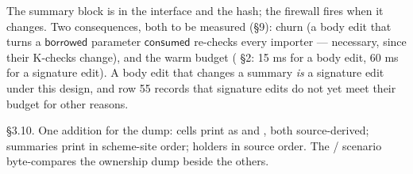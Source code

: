 
The summary block is in the interface and the hash; the firewall fires when it changes. Two consequences, both to be measured (§9): churn (a body edit that turns a $\mathsf{borrowed}$ parameter $\mathsf{consumed}$ re-checks every importer — necessary, since their K-checks change), and the warm budget ( §2: 15 ms for a body edit, 60 ms for a signature edit). A body edit that changes a summary \emph{is} a signature edit under this design, and  row 55 records that signature edits do not yet meet their budget for other reasons.


§3.10. One addition for the dump: cells print as  and , both source-derived; summaries print in scheme-site order; holders in source order. The / scenario byte-compares the ownership dump beside the others.
